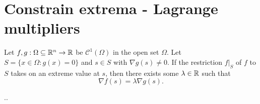 
\section{Constrain extrema - Lagrange multipliers} %
\label{sec:lagrangemultiplier}

\begin{thm}
	Let $f,g:\Omega \subseteq \mathbb{R}^n \to \mathbb{R}$ be $\mathcal{C}^{1}(\Omega)$
	in the open set $\Omega$. Let $S=\{ x \in \Omega : g(x)=0 \}$ and
	$s \in S$ with $\nabla g(s) \neq 0$. If the restriction $f|_{S}$ of
	$f$ to $S$ takes on an extreme value at $s$, then there exists some
	$\lambda \in \mathbb{R}$ such that
	\[
		\nabla f(s) = \lambda \nabla g(s).
	\]
\end{thm}

\begin{exmp}
	..
\end{exmp}
